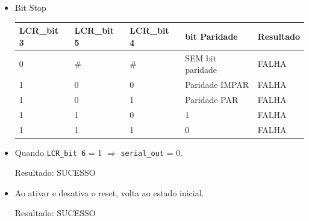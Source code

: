 \documentclass[12pt, a4paper]{article}
\begin{document}
\begin{itemize}
		\item Bit Stop
		\begin{table}[H]
			\begin{center}
				\begin{tabular}{|l|l|l|l|l|}
					\hline
					LCR\_bit 3 & LCR\_bit 5 & LCR\_bit 4 & bit Paridade     & Resultado \\ \hline
					0          & \#         & \#         & SEM bit paridade & FALHA          \\ \hline
					1          & 0          & 0          & Paridade IMPAR   & FALHA          \\ \hline
					1          & 0          & 1          & Paridade PAR     & FALHA          \\ \hline
					1          & 1          & 0          & 1                & FALHA          \\ \hline
					1          & 1          & 1          & 0                & FALHA          \\ \hline
				\end{tabular}
			\end{center}
		\end{table}
		
		\item Quando \texttt{LCR\_bit 6} = 1 $\Rightarrow$ \texttt{serial\_out} = 0. 
		\par Resultado: SUCESSO
		
		\item Ao ativar e desativa o reset, volta ao estado inicial. 
		\par Resultado: SUCESSO
		
	\end{itemize}
	
	
\end{document}
